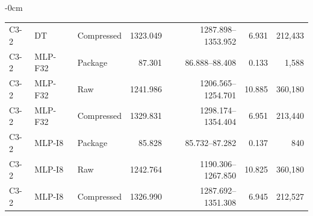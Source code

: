 \begin{table}[!htbp]
\begin{adjustwidth}{-\extralength}{0cm}
\begin{tabular}{lllrrrr}
C3-2 & DT & Compressed & 1323.049 & 1287.898--1353.952 & 6.931 & 212,433\\
C3-2 & MLP-F32 & Package & 87.301 & 86.888--88.408 & 0.133 & 1,588\\
C3-2 & MLP-F32 & Raw & 1241.986 & 1206.565--1254.701 & 10.885 & 360,180\\
C3-2 & MLP-F32 & Compressed & 1329.831 & 1298.174--1354.404 & 6.951 & 213,440\\
C3-2 & MLP-I8 & Package & 85.828 & 85.732--87.282 & 0.137 & 840\\
C3-2 & MLP-I8 & Raw & 1242.764 & 1190.306--1267.850 & 10.825 & 360,180\\
C3-2 & MLP-I8 & Compressed & 1326.990 & 1287.692--1351.308 & 6.945 & 212,527\\
\bottomrule\end{tabular}
\end{adjustwidth}
\end{table}
